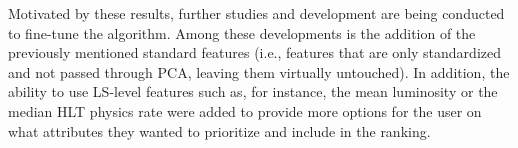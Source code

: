 Motivated by these results, further studies and development are being conducted to fine-tune the algorithm. Among these developments is the addition of the previously mentioned standard features (i.e., features that are only standardized and not passed through PCA, leaving them virtually untouched). In addition, the ability to use LS-level features such as, for instance, the mean luminosity or the median HLT physics rate were added to provide more options for the user on what attributes they wanted to prioritize and include in the ranking.




